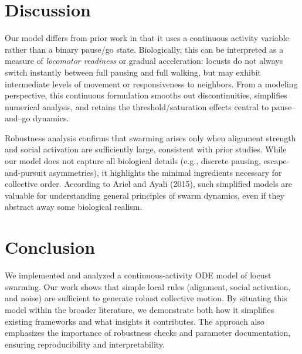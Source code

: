 \documentclass[11pt,a4paper]{article}
\begin{document}
\section{Discussion}

Our model differs from prior work in that it uses a continuous activity variable rather than a binary pause/go state. Biologically, this can be interpreted as a measure of \emph{locomotor readiness} or gradual acceleration: locusts do not always switch instantly between full pausing and full walking, but may exhibit intermediate levels of movement or responsiveness to neighbors. From a modeling perspective, this continuous formulation smooths out discontinuities, simplifies numerical analysis, and retains the threshold/saturation effects central to pause–and–go dynamics.  

Robustness analysis confirms that swarming arises only when alignment strength and social activation are sufficiently large, consistent with prior studies. While our model does not capture all biological details (e.g., discrete pausing, escape-and-pursuit asymmetries), it highlights the minimal ingredients necessary for collective order. According to Ariel and Ayali (2015), such simplified models are valuable for understanding general principles of swarm dynamics, even if they abstract away some biological realism.

\section{Conclusion}

We implemented and analyzed a continuous-activity ODE model of locust swarming. Our work shows that simple local rules (alignment, social activation, and noise) are sufficient to generate robust collective motion. By situating this model within the broader literature, we demonstrate both how it simplifies existing frameworks and what insights it contributes. The approach also emphasizes the importance of robustness checks and parameter documentation, ensuring reproducibility and interpretability.
\end{document}
